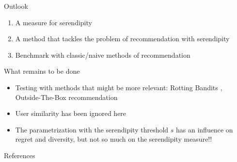 \documentclass[10pt,frenchb]{beamer}
\begin{document}
 \begin{frame}

\begin{block}{Outlook}

\begin{enumerate}
\item A measure for serendipity
\pause
\item A method that tackles the problem of recommendation with serendipity
\pause
\item Benchmark with classic/naive methods of recommendation
\end{enumerate}
\end{block}

\pause 

\begin{alertblock}{What remains to be done}

\begin{itemize}
\item Testing with methods that might be more relevant: Rotting Bandits \cite{seznec2018rotting}, Outside-The-Box recommendation \cite{abbassi2009getting}
\pause
\item User similarity has been ignored here
\pause
\item The parametrization with the serendipity threshold $s$ has an influence on regret and diversity, but not so much on the serendipity measure!! 
\end{itemize}
\end{alertblock}

\end{frame}

\begin{frame}[allowframebreaks]{References}
 

\end{frame}
\end{document}

